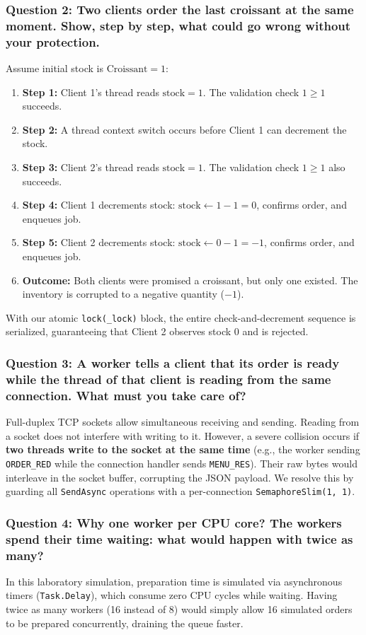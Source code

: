 \documentclass[12pt,a4paper]{article}
\begin{document}
\subsubsection{Question 2: Two clients order the last croissant at the same moment. Show, step by step, what could go wrong without your protection.}
Assume initial stock is $\text{Croissant} = 1$:
\begin{enumerate}
    \item \textbf{Step 1:} Client 1's thread reads $\text{stock} = 1$. The validation check $1 \ge 1$ succeeds.
    \item \textbf{Step 2:} A thread context switch occurs before Client 1 can decrement the stock.
    \item \textbf{Step 3:} Client 2's thread reads $\text{stock} = 1$. The validation check $1 \ge 1$ also succeeds.
    \item \textbf{Step 4:} Client 1 decrements stock: $\text{stock} \leftarrow 1 - 1 = 0$, confirms order, and enqueues job.
    \item \textbf{Step 5:} Client 2 decrements stock: $\text{stock} \leftarrow 0 - 1 = -1$, confirms order, and enqueues job.
    \item \textbf{Outcome:} Both clients were promised a croissant, but only one existed. The inventory is corrupted to a negative quantity ($-1$).
\end{enumerate}
With our atomic \texttt{lock(\_lock)} block, the entire check-and-decrement sequence is serialized, guaranteeing that Client 2 observes stock $0$ and is rejected.

\subsubsection{Question 3: A worker tells a client that its order is ready while the thread of that client is reading from the same connection. What must you take care of?}
Full-duplex TCP sockets allow simultaneous receiving and sending. Reading from a socket does not interfere with writing to it. However, a severe collision occurs if \textbf{two threads write to the socket at the same time} (e.g., the worker sending \texttt{ORDER\_RED} while the connection handler sends \texttt{MENU\_RES}). Their raw bytes would interleave in the socket buffer, corrupting the JSON payload. We resolve this by guarding all \texttt{SendAsync} operations with a per-connection \texttt{SemaphoreSlim(1, 1)}.

\subsubsection{Question 4: Why one worker per CPU core? The workers spend their time waiting: what would happen with twice as many?}
In this laboratory simulation, preparation time is simulated via asynchronous timers (\texttt{Task.Delay}), which consume zero CPU cycles while waiting. Having twice as many workers (16 instead of 8) would simply allow 16 simulated orders to be prepared concurrently, draining the queue faster. 
\end{document}
